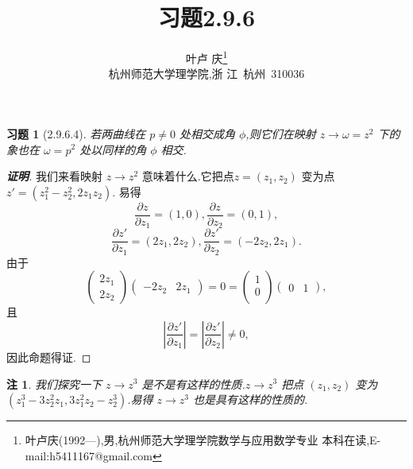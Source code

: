 \documentclass[a4paper]{article}
\newtheorem*{exercise}{习题}
\newtheorem*{remark}{注}
\newcommand{\pa}{\partial} \newcommand{\Om}{\Omega}
\begin{document}
\title{\huge{\bf{习题2.9.6}}} \author{\small{叶卢
    庆\footnote{叶卢庆(1992---),男,杭州师范大学理学院数学与应用数学专业
      本科在读,E-mail:h5411167@gmail.com}}\\{\small{杭州师范大学理学院,浙
      江~杭州~310036}}}
\maketitle
\begin{exercise}[2.9.6.4]
若两曲线在 $p\neq 0$ 处相交成角 $\phi$,则它们在映射 $z\to \omega=z^2$
下的象也在 $\omega=p^2$ 处以同样的角 $\phi$ 相交.  
\end{exercise}
\begin{proof}[\bf{证明}]
我们来看映射 $z\to z^2$ 意味着什么.它把点$z=(z_1,z_2)$
变为点$z'=(z_1^2-z_2^2,2z_1z_2).$
易得
$$
\frac{\pa z}{\pa z_1}=(1,0),\frac{\pa z}{\pa z_2}=(0,1),
$$
$$
\frac{\pa z'}{\pa z_1}=(2z_1,2z_2),\frac{\pa z'}{\pa z_2}=(-2z_2,2z_1).
$$
由于
$$
\begin{pmatrix}
  2z_1\\
2z_2
\end{pmatrix}\begin{pmatrix}
  -2z_2&2z_1
\end{pmatrix}=0=\begin{pmatrix}
  1\\
0\\
\end{pmatrix}\begin{pmatrix}
  0&1
\end{pmatrix},
$$
且
$$
\left |\frac{\pa z'}{\pa z_1}\right|=\left|\frac{\pa z'}{\pa
    z_2}\right|\neq 0,
$$
因此命题得证.
\end{proof}
\begin{remark}
  我们探究一下 $z\to z^3$ 是不是有这样的性质.$z\to z^3$ 把点
  $(z_1,z_2)$ 变为 $(z_1^3-3z_2^2z_{1},3z_1^2z_{2}-z_2^3)$.易得 $z\to
  z^3$ 也是具有这样的性质的.
\end{remark}
\end{document}

